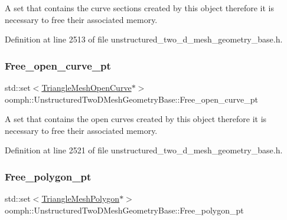 A set that contains the curve sections created by this object therefore it is necessary to free their associated memory. 



Definition at line 2513 of file unstructured\+\_\+two\+\_\+d\+\_\+mesh\+\_\+geometry\+\_\+base.\+h.

\mbox{\label{classoomph_1_1UnstructuredTwoDMeshGeometryBase_aa3b1beb78b5261398428c1e14a6411ae}} 
\subsubsection{\texorpdfstring{Free\+\_\+open\+\_\+curve\+\_\+pt}{Free\_open\_curve\_pt}}
{\footnotesize\ttfamily std\+::set$<$\hyperlink{classoomph_1_1TriangleMeshOpenCurve}{Triangle\+Mesh\+Open\+Curve}$\ast$$>$ oomph\+::\+Unstructured\+Two\+D\+Mesh\+Geometry\+Base\+::\+Free\+\_\+open\+\_\+curve\+\_\+pt\hspace{0.3cm}{\ttfamily [protected]}}



A set that contains the open curves created by this object therefore it is necessary to free their associated memory. 



Definition at line 2521 of file unstructured\+\_\+two\+\_\+d\+\_\+mesh\+\_\+geometry\+\_\+base.\+h.

\mbox{\label{classoomph_1_1UnstructuredTwoDMeshGeometryBase_ad0e156686ae6ae41a187d7a0c71c6861}} 
\subsubsection{\texorpdfstring{Free\+\_\+polygon\+\_\+pt}{Free\_polygon\_pt}}
{\footnotesize\ttfamily std\+::set$<$\hyperlink{classoomph_1_1TriangleMeshPolygon}{Triangle\+Mesh\+Polygon}$\ast$$>$ oomph\+::\+Unstructured\+Two\+D\+Mesh\+Geometry\+Base\+::\+Free\+\_\+polygon\+\_\+pt\hspace{0.3cm}{\ttfamily [protected]}}



